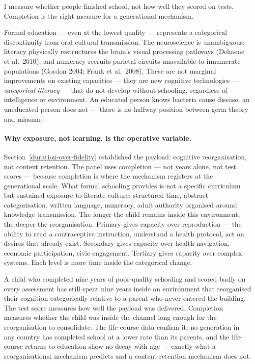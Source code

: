 \documentclass[12pt,letterpaper]{article}
\begin{document}
I measure whether people finished school, not how well they
scored on tests. Completion is the right measure for a generational
mechanism.

Formal education --- even at the lowest quality --- represents a
categorical discontinuity from oral cultural transmission. The
neuroscience is unambiguous: literacy physically restructures the brain's
visual processing pathways (Dehaene et al.~2010), and numeracy recruits
parietal circuits unavailable to innumerate populations (Gordon 2004;
Frank et al.~2008). These are not marginal improvements on existing
capacities --- they are new cognitive technologies ---
\emph{categorical literacy} --- that do not develop without schooling,
regardless of intelligence or environment. An educated person knows
bacteria cause disease; an uneducated person does not --- there is no
halfway position between germ theory and miasma.

\paragraph{Why exposure, not learning, is the operative variable.}

Section~\ref{duration-over-fidelity} established the payload:
cognitive reorganisation, not content retention. The panel uses
completion --- not years alone, not test scores --- because completion
is where the mechanism registers at the generational scale. What
formal schooling provides is not a specific curriculum but sustained
exposure to literate culture: structured time, abstract categorisation,
written language, numeracy, adult authority organised around
knowledge transmission. The longer the child remains inside this
environment, the deeper the reorganisation. Primary gives capacity
over reproduction --- the ability to read a contraceptive instruction,
understand a health protocol, act on desires that already exist.
Secondary gives capacity over health navigation, economic
participation, civic engagement. Tertiary gives capacity over
complex systems. Each level is more time inside the categorical change.

A child who completed nine years of poor-quality schooling and scored
badly on every assessment has still spent nine years inside an
environment that reorganised their cognition categorically relative
to a parent who never entered the building. The test score measures
how well the payload was delivered. Completion measures whether the
child was inside the channel long enough for the reorganisation to
consolidate. The life-course data confirm it: no generation in any
country has completed school at a lower rate than its parents, and
the life-course returns to education show no decay with age ---
exactly what a reorganisational mechanism predicts and a
content-retention mechanism does not.
\end{document}
